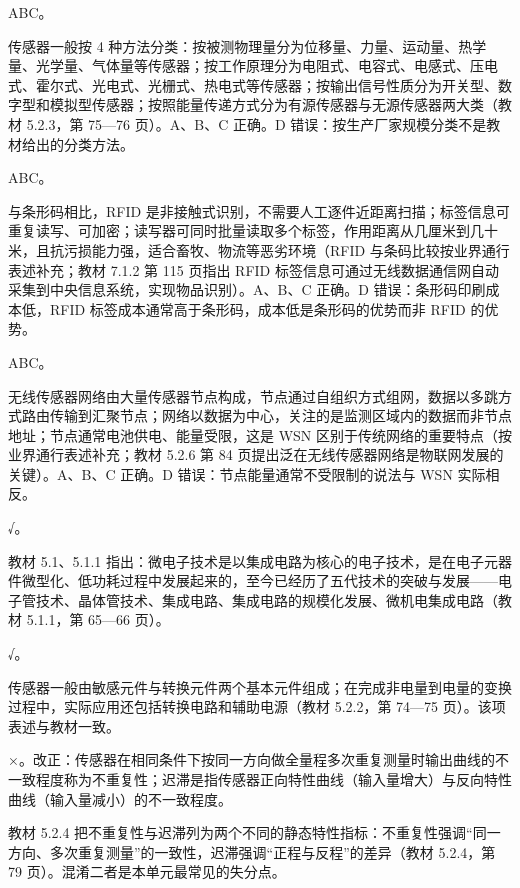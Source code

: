 \documentclass[a4paper,11pt]{article}
\begin{document}
\q ABC。\begin{analysis}传感器一般按 4 种方法分类：按被测物理量分为位移量、力量、运动量、热学量、光学量、气体量等传感器；按工作原理分为电阻式、电容式、电感式、压电式、霍尔式、光电式、光栅式、热电式等传感器；按输出信号性质分为开关型、数字型和模拟型传感器；按照能量传递方式分为有源传感器与无源传感器两大类（教材 5.2.3，第 75—76 页）。A、B、C 正确。D 错误：按生产厂家规模分类不是教材给出的分类方法。\end{analysis}

\q ABC。\begin{analysis}与条形码相比，RFID 是非接触式识别，不需要人工逐件近距离扫描；标签信息可重复读写、可加密；读写器可同时批量读取多个标签，作用距离从几厘米到几十米，且抗污损能力强，适合畜牧、物流等恶劣环境（RFID 与条码比较按业界通行表述补充；教材 7.1.2 第 115 页指出 RFID 标签信息可通过无线数据通信网自动采集到中央信息系统，实现物品识别）。A、B、C 正确。D 错误：条形码印刷成本低，RFID 标签成本通常高于条形码，成本低是条形码的优势而非 RFID 的优势。\end{analysis}

\q ABC。\begin{analysis}无线传感器网络由大量传感器节点构成，节点通过自组织方式组网，数据以多跳方式路由传输到汇聚节点；网络以数据为中心，关注的是监测区域内的数据而非节点地址；节点通常电池供电、能量受限，这是 WSN 区别于传统网络的重要特点（按业界通行表述补充；教材 5.2.6 第 84 页提出泛在无线传感器网络是物联网发展的关键）。A、B、C 正确。D 错误：节点能量通常不受限制的说法与 WSN 实际相反。\end{analysis}


\q √。\begin{analysis}教材 5.1、5.1.1 指出：微电子技术是以集成电路为核心的电子技术，是在电子元器件微型化、低功耗过程中发展起来的，至今已经历了五代技术的突破与发展——电子管技术、晶体管技术、集成电路、集成电路的规模化发展、微机电集成电路（教材 5.1.1，第 65—66 页）。\end{analysis}

\q √。\begin{analysis}传感器一般由敏感元件与转换元件两个基本元件组成；在完成非电量到电量的变换过程中，实际应用还包括转换电路和辅助电源（教材 5.2.2，第 74—75 页）。该项表述与教材一致。\end{analysis}

\q ×。改正：传感器在相同条件下按同一方向做全量程多次重复测量时输出曲线的不一致程度称为不重复性；迟滞是指传感器正向特性曲线（输入量增大）与反向特性曲线（输入量减小）的不一致程度。\begin{analysis}教材 5.2.4 把不重复性与迟滞列为两个不同的静态特性指标：不重复性强调“同一方向、多次重复测量”的一致性，迟滞强调“正程与反程”的差异（教材 5.2.4，第 79 页）。混淆二者是本单元最常见的失分点。\end{analysis}
\end{document}

